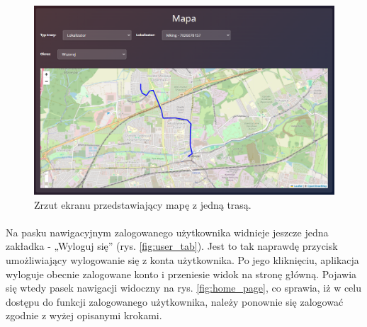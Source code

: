 \begin{figure}
	\centering
	\includegraphics[width=1\textwidth]{./graf/map_route.png}
	\caption{Zrzut ekranu przedstawiający mapę z jedną trasą.}
	\label{fig:map_route}
\end{figure}


\paragraph{}
Na pasku nawigacyjnym zalogowanego użytkownika widnieje jeszcze jedna zakładka - „Wyloguj się” (rys. \ref{fig:user_tab}). Jest to tak naprawdę przycisk umożliwiający wylogowanie się z konta użytkownika. Po jego kliknięciu, aplikacja wyloguje obecnie zalogowane konto i przeniesie widok na stronę główną. Pojawia się wtedy pasek nawigacji widoczny na rys. \ref{fig:home_page}, co sprawia, iż w celu dostępu do funkcji zalogowanego użytkownika, należy ponownie się zalogować zgodnie z wyżej opisanymi krokami.

